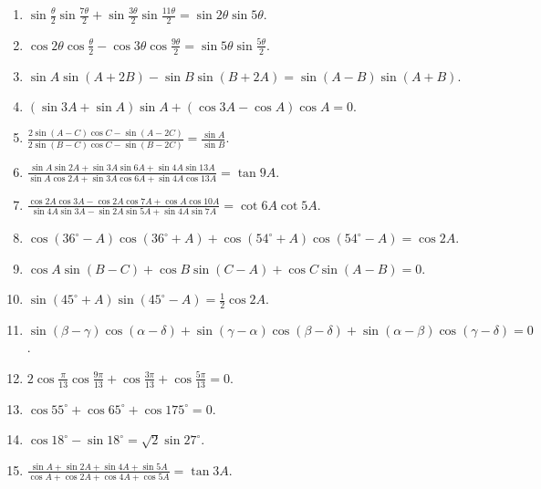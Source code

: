 \begin{enumerate}[resume]
\item $\sin\frac{\theta}{2}\sin\frac{7\theta}{2} + \sin \frac{3\theta}{2}\sin\frac{11\theta}{2} =\sin 2\theta\sin 5\theta$.

\item $\cos 2\theta\cos \frac{\theta}{2} -\cos3\theta\cos\frac{9\theta}{2} = \sin5\theta\sin\frac{5\theta}{2}$.

\item $\sin A\sin(A + 2B) - \sin B\sin(B + 2A) = \sin(A - B)\sin(A + B)$.

\item $(\sin 3A + \sin A)\sin A + (\cos 3A - \cos A)\cos A = 0$.

\item $\frac{2\sin(A - C)\cos C - \sin(A - 2C)}{2\sin(B - C)\cos C - \sin(B - 2C)} = \frac{\sin A}{\sin B}$.

\item $\frac{\sin A\sin 2A + \sin 3A\sin 6A + \sin4A\sin 13A}{\sin A\cos2A + \sin 3A\cos 6A + \sin 4A\cos 13A} = \tan 9A$.

\item $\frac{\cos 2A\cos 3A - \cos 2A\cos 7A + \cos A\cos 10A}{\sin 4A\sin 3A - \sin 2A\sin 5A + \sin 4A\sin 7A} =\cot 6A\cot 5A$.

\item $\cos(36^\circ - A)\cos(36^\circ + A) + \cos(54^\circ + A)\cos(54^\circ - A) = \cos 2A$.

\item $\cos A\sin(B - C) + \cos B\sin(C - A) + \cos C\sin(A - B) = 0$.

\item $\sin(45^\circ + A)\sin(45^\circ - A) = \frac{1}{2}\cos 2A$.

\item $\sin(\beta - \gamma)\cos(\alpha - \delta) + \sin(\gamma - \alpha)\cos(\beta - \delta) + \sin(\alpha -
    \beta)\cos(\gamma - \delta) = 0$.

\item $2\cos\frac{\pi}{13}\cos \frac{9\pi}{13} + \cos \frac{3\pi}{13} + \cos \frac{5\pi}{13} = 0$.

\item $\cos 55^\circ + \cos65^\circ + \cos 175^\circ = 0$.

\item $\cos 18^\circ -\sin 18^\circ = \sqrt{2}\sin 27^\circ$.

\item $\frac{\sin A + \sin 2A + \sin 4A + \sin 5A}{\cos A + \cos 2A + \cos 4A + \cos 5A} = \tan 3A$.


\end{enumerate}
